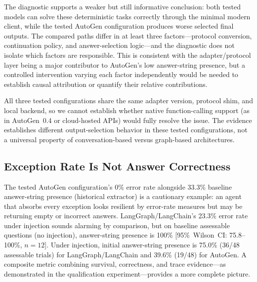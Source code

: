 \documentclass[make,article,submit,moreauthors,pdftex]{mdpi}
\newcommand{\Wrev}[1]{\texorpdfstring{{\color{RevisionOrange}#1}}{#1}}
\begin{document}
{The diagnostic supports a weaker but still informative conclusion: both tested models can solve these deterministic tasks correctly through the minimal modern client, while the tested AutoGen configuration produces worse selected final outputs. The compared paths differ in at least three factors---protocol conversion, continuation policy, and answer-selection logic---and the diagnostic does not isolate which factors are responsible. This is consistent with the adapter/protocol layer being a major contributor to AutoGen's low answer-string presence, but a controlled intervention varying each factor independently would be needed to establish causal attribution or quantify their relative contributions.}

{All three tested configurations share the same adapter version, protocol shim, and local backend, so we cannot establish whether native function-calling support (as in AutoGen~0.4 or cloud-hosted APIs) would fully resolve the issue. The evidence establishes different output-selection behavior in these tested configurations, not a universal property of conversation-based versus graph-based architectures.}

\subsection{\Wrev{Exception Rate Is Not Answer Correctness}}

\Wrev{The tested AutoGen configuration's} 0\% error rate alongside 33.3\% baseline answer-string presence (historical extractor) is a cautionary example: an agent that absorbs every exception looks resilient by error-rate measures but may be returning empty or incorrect answers. LangGraph/LangChain's 23.3\% error rate under injection sounds alarming by comparison, but on baseline assessable questions (no injection), answer-string presence is 100\% [95\%~Wilson~CI: 75.8--100\%, $n = 12$]. Under injection, initial answer-string presence is 75.0\% (36/48 assessable trials) for LangGraph/LangChain and 39.6\% (19/48) for AutoGen. A composite metric combining survival, correctness, and trace evidence---as demonstrated in the qualification experiment---provides a more complete picture.
\end{document}
